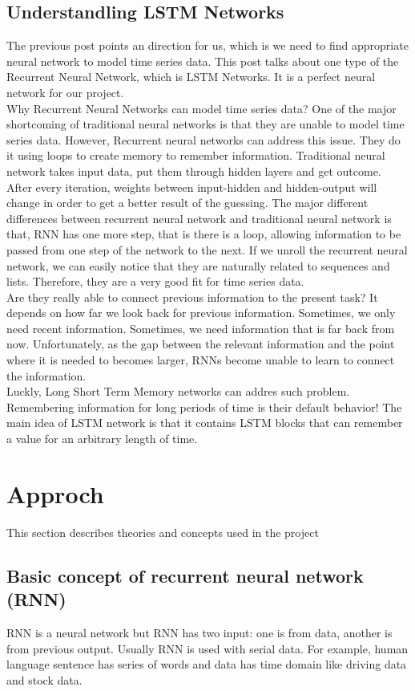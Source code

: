 \documentclass[prodmode,acmtecs]{acmsmall} %
\begin{document}
\subsection{Understandling LSTM Networks}
The previous post points an direction for us, which is we need to find appropriate neural network to model time series data. This post talks about one type of the Recurrent Neural Network, which is LSTM Networks. It is a perfect neural network for our project. \\
Why Recurrent Neural Networks can model time series data? One of the major shortcoming of traditional neural networks is that they are unable to model time series data. However, Recurrent neural networks can address this issue. They do it using loops to create memory to remember information. Traditional neural network takes input data, put them through hidden layers and get outcome. After every iteration, weights between input-hidden and hidden-output will change in order to get a better result of the guessing. The major different differences between recurrent neural network and traditional neural network is that, RNN has one more step, that is there is a loop, allowing information to be passed from one step of the network to the next. If we unroll the recurrent neural network, we can easily notice that they are naturally related to sequences and lists. Therefore, they are a very good fit for time series data.\\
Are they really able to connect previous information to the present task? It depends on how far we look back for previous information. Sometimes, we only need recent information. Sometimes, we need information that is far back from now. Unfortunately, as the gap between the relevant information and the point where it is needed to becomes larger, RNNs become unable to learn to connect the information.\\
Luckly, Long Short Term Memory networks can addres such problem. Remembering information for long periods of time is their default behavior! The main idea of LSTM network is that it contains LSTM blocks that can remember a value for an arbitrary length of time.

\newpage
\section{Approch}
\label{sec:sim}
This section describes theories and concepts used in the project

\subsection{Basic concept of recurrent neural network (RNN)}
RNN is a neural network but RNN has two input: one is from data, another is from previous output. Usually RNN is used with serial data. For example, human language sentence has series of words and data has time domain like driving data and stock data.
\end{document}
